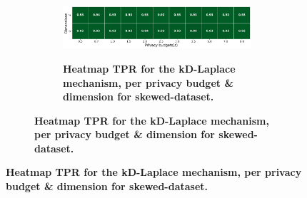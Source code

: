 \newpage
\begin{figure}[H]
    \centering
    \begin{subfigure}[b]{0.9\textwidth}
        \begin{subfigure}[c]{1\textwidth}
            \caption{\textbf{Heatmap TPR for the kD-Laplace mechanism, per privacy budget \& dimension for skewed-dataset.}}
            \includegraphics[width=1\textwidth]{Results/kd-laplace/kd-Laplace/skewed-dataset/tpr.png}
            \label{fig:privacy_tpr_skewed-dataset_adversial_advantage_kd-laplace}
        \end{subfigure}
        \vfill %


\end{subfigure}
\end{figure}

